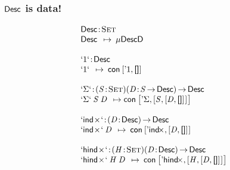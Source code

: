 \documentclass{beamer}
\begin{document}
\begin{frame}

\frametitle{\(\Desc\) is data!}


\[\stk{
\Bhab{\Desc}{\Set}\\
\Desc \:\:\mapsto\: \Mu{\DescD}\\
\\
\Bhab{\SYMBCUnit}{\Desc}\\
\SYMBCUnit \:\:\mapsto\: 
    \Con{\pair{\SYMBDUnit}{\void}{}}\\
\\
\Bhab{\SYMBCSigma}
     {\PITEL{\V{S}}{\Set} 
      \PI{\V{D}}{\V{S} \To \Desc}{\Desc}} \\
\SYMBCSigma\: \V{S}\: \V{D} \:\:\mapsto 
    \Con{\pair{\SYMBDSigma}
              {\pair{\V{S}}
                    {\pair{\V{D}}
                          {\void}{}}{}}{}} \\
\\
\Bhab{\SYMBCIndx}
     {\PI{\V{D}}{\Desc}{\Desc}} \\
\SYMBCIndx\: \V{D} \:\:\mapsto\: 
    \Con{\pair{\SYMBDIndx}
              {\pair{\V{D}}
                    {\void}{}}{}} \\
\\
\Bhab{\SYMBCHindx}
     {\PITEL{\V{H}}{\Set}
      \PI{\V{D}}{\Desc}{\Desc}} \\
\SYMBCHindx\: \V{H}\: \V{D} \:\:\mapsto\: 
    \Con{\pair{\SYMBDHindx}
              {\pair{\V{H}}
                    {\pair{\V{D}}
                          {\void}{}}{}}{}}
}\]

\end{frame}
\end{document}
